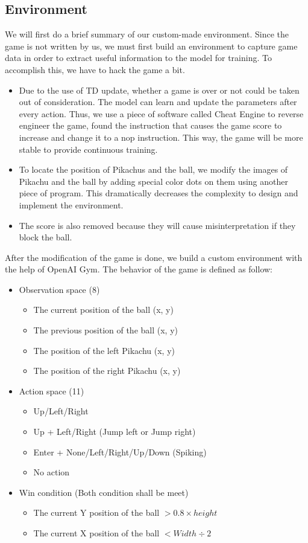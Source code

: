 \documentclass[sigconf]{acmart}
\begin{document}
\subsection{Environment}
We will first do a brief summary of our custom-made environment. Since the game is not written by us, we must first build an environment to capture game data in order to extract useful information to the model for training. To accomplish this, we have to hack the game a bit.
\begin{itemize}
  \item Due to the use of TD update, whether a game is over or not could be taken out of consideration. The model can learn and update the parameters after every action. Thus, we use a piece of software called Cheat Engine to reverse engineer the game, found the instruction that causes the game score to increase and change it to a nop instruction. This way, the game will be more stable to provide continuous training.
  \item To locate the position of Pikachus and the ball, we modify the images of Pikachu and the ball by adding special color dots on them using another piece of program. This dramatically decreases the complexity to design and implement the environment.
  \item The score is also removed because they will cause misinterpretation if they block the ball.
\end{itemize}
After the modification of the game is done, we build a custom environment with the help of OpenAI Gym. The behavior of the game is defined as follow:
\begin{itemize}
  \item Observation space (8)
     \begin{itemize} 
        \item The current position of the ball (x, y)
        \item The previous position of the ball (x, y)
        \item The position of the left Pikachu (x, y)
        \item The position of the right Pikachu (x, y)
     \end{itemize}
\item Action space (11)
  \begin{itemize} 
    \item Up/Left/Right
    \item Up + Left/Right (Jump left or Jump right)
    \item Enter + None/Left/Right/Up/Down (Spiking)
    \item No action
  \end{itemize}
\item Win condition (Both condition shall be meet)
  \begin{itemize} 
    \item The current Y position of the ball $ > 0.8 \times height$
    \item The current X position of the ball $ < Width \div 2$
  \end{itemize}
\end{itemize}
\end{document}
